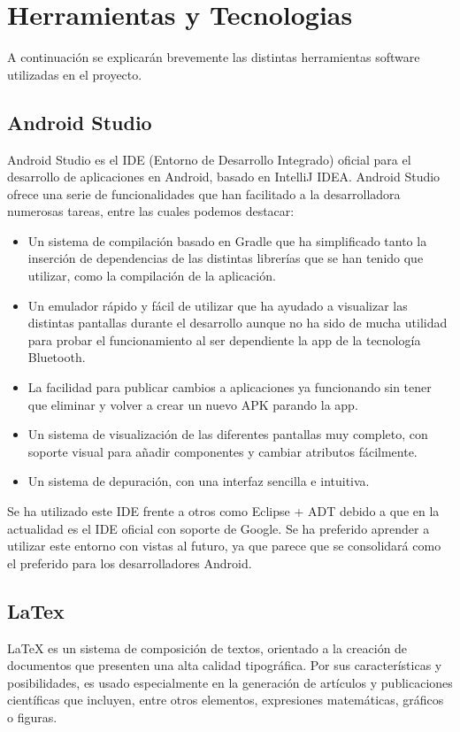\documentclass{article}
\begin{document}
    \newpage
    \section{Herramientas y Tecnologias}
    A continuación se explicarán brevemente las distintas herramientas software utilizadas en el proyecto. 
    \subsection{Android Studio}
    Android Studio es el IDE (Entorno de Desarrollo Integrado) oficial para el desarrollo de aplicaciones en Android, basado en IntelliJ IDEA. Android Studio ofrece una serie de funcionalidades que han facilitado a la desarrolladora numerosas tareas, entre las cuales podemos destacar:
    \begin{itemize}
    \item Un sistema de compilación basado en Gradle que ha simplificado tanto la inserción de dependencias de las distintas librerías que se han tenido que utilizar, como la compilación de la aplicación.
    \item Un emulador rápido y fácil de utilizar que ha ayudado a visualizar las distintas pantallas durante el desarrollo aunque no ha sido de mucha utilidad para probar el funcionamiento al ser dependiente la app de la tecnología Bluetooth.
    \item La facilidad para publicar cambios a aplicaciones ya funcionando sin tener que eliminar y volver a crear un nuevo APK parando la app.
    \item Un sistema de visualización de las diferentes pantallas muy completo, con soporte visual para añadir componentes y cambiar atributos fácilmente.
    \item Un sistema de depuración, con una interfaz sencilla e intuitiva.
    \end{itemize} 

    Se ha utilizado este IDE frente a otros como Eclipse + ADT debido a que en la actualidad es el IDE oficial con soporte de Google. Se ha preferido aprender a utilizar este entorno con vistas al futuro, ya que parece que se consolidará como el preferido para los desarrolladores Android.

    \subsection{LaTex}

LaTeX es un sistema de composición de textos, orientado a la creación de documentos que presenten una alta calidad tipográfica. Por sus características y posibilidades, es usado especialmente en la generación de artículos y publicaciones científicas que incluyen, entre otros elementos, expresiones matemáticas, gráficos o figuras.
\end{document}
